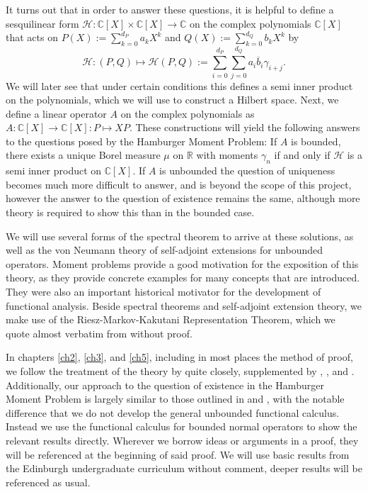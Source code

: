 \documentclass[12pt,oneside]{report}
\begin{document}
It turns out that in order to answer these questions, it is helpful to define a sesquilinear form $\mathcal{H}: \mathbb{C}[X] \times \mathbb{C}[X] \to \mathbb{C}$ on the complex polynomials $\mathbb{C}[X]$ that acts on $P(X) := \sum_{k=0}^{d_{P}}a_{k}X^{k}$ and $Q(X) := \sum_{k=0}^{d_{Q}}b_{k}X^{k}$ by
$$\mathcal{H}: (P, Q) \mapsto \mathcal{H}(P,Q) := \sum_{i = 0}^{d_{P}} \sum_{j = 0}^{d_{Q}} a_{i}\overline{b}_{i}\gamma_{i+j}.$$
We will later see that under certain conditions this defines a semi inner product on the polynomials, which we will use to construct a Hilbert space. Next, we define a linear operator $A$ on the complex polynomials as $A: \mathbb{C}[X] \to \mathbb{C}[X]: P \mapsto XP$. These constructions will yield the following answers to the questions posed by the Hamburger Moment Problem: If $A$ is bounded, there exists a unique Borel measure $\mu$ on $\mathbb{R}$ with moments $\gamma_{n}$ if and only if $\mathcal{H}$ is a semi inner product on $\mathbb{C}[X]$. If $A$ is unbounded the question of uniqueness becomes much more difficult to answer, and is beyond the scope of this project, however the answer to the question of existence remains the same, although more theory is required to show this than in the bounded case.

We will use several forms of the spectral theorem to arrive at these solutions, as well as the von Neumann theory of self-adjoint extensions for unbounded operators. Moment problems provide a good motivation for the exposition of this theory, as they provide concrete examples for many concepts that are introduced. They were also an important historical motivator for the development of functional analysis. Beside spectral theorems and self-adjoint extension theory, we make use of the Riesz-Markov-Kakutani Representation Theorem, which we quote almost verbatim from \cite{rudin_real_2013} without proof.

In chapters \ref{ch2}, \ref{ch3}, and \ref{ch5}, including in most places the method of proof, we follow the treatment of the theory by \cite{Reed_Simon_1980} quite closely, supplemented by \cite{Hunter_Nachtergaele_2007}, \cite{simon_classical_1998}, and \cite{Reed_Simon_1975}. Additionally, our approach to the question of existence in the Hamburger Moment Problem is largely similar to those outlined in \cite{simon_classical_1998} and \cite{Reed_Simon_1975}, with the notable difference that we do not develop the general unbounded functional calculus. Instead we use the functional calculus for bounded normal operators to show the relevant results directly. Wherever we borrow ideas or arguments in a proof, they will be referenced at the beginning of said proof. We will use basic results from the Edinburgh undergraduate curriculum without comment, deeper results will be referenced as usual.
\end{document}
